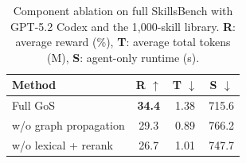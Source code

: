 \begin{table}[t]
\caption{Component ablation on full SkillsBench with GPT-5.2 Codex and the 1{,}000-skill library. \textbf{R}: average reward (\%), \textbf{T}: average total tokens (M), \textbf{S}: agent-only runtime (s).}
\label{tab:gos-ablation}
\centering
\footnotesize
\setlength{\tabcolsep}{4.5pt}
\begin{tabular}{lccc}
\toprule
Method & R $\uparrow$ & T $\downarrow$ & S $\downarrow$ \\
\midrule
Full GoS & \textbf{34.4} & 1.38 & 715.6 \\
w/o graph propagation & 29.3 & 0.89 & 766.2 \\
w/o lexical + rerank & 26.7 & 1.01 & 747.7 \\
\bottomrule
\end{tabular}
\end{table}
